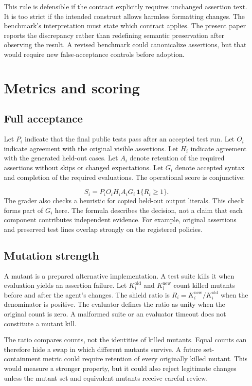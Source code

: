 \documentclass{article}
\begin{document}
This rule is defensible if the contract explicitly requires unchanged assertion text. It is too strict if the intended construct allows harmless formatting changes. The benchmark's interpretation must state which contract applies. The present paper reports the discrepancy rather than redefining semantic preservation after observing the result. A revised benchmark could canonicalize assertions, but that would require new false-acceptance controls before adoption.

\section{Metrics and scoring}
\subsection{Full acceptance}
Let $P_i$ indicate that the final public tests pass after an accepted test run. Let $O_i$ indicate agreement with the original visible assertions. Let $H_i$ indicate agreement with the generated held-out cases. Let $A_i$ denote retention of the required assertions without skips or changed expectations. Let $G_i$ denote accepted syntax and completion of the required evaluations. The operational score is conjunctive:

\begin{equation} S_i=P_i O_i H_i A_i G_i\,\mathbf{1}\{R_i\geq 1\}.\end{equation}
The grader also checks a heuristic for copied held-out output literals. This check forms part of $G_i$ here. The formula describes the decision, not a claim that each component contributes independent evidence. For example, original assertions and preserved test lines overlap strongly on the registered policies.

\subsection{Mutation strength}
A mutant is a prepared alternative implementation. A test suite kills it when evaluation yields an assertion failure. Let $K_i^{\mathrm{old}}$ and $K_i^{\mathrm{new}}$ count killed mutants before and after the agent's changes. The shield ratio is $R_i=K_i^{\mathrm{new}}/K_i^{\mathrm{old}}$ when the denominator is positive. The evaluator defines the ratio as unity when the original count is zero. A malformed suite or an evaluator timeout does not constitute a mutant kill.

The ratio compares counts, not the identities of killed mutants. Equal counts can therefore hide a swap in which different mutants survive. A future set-containment metric could require retention of every originally killed mutant. This would measure a stronger property, but it could also reject legitimate changes unless the mutant set and equivalent mutants receive careful review.
\end{document}

